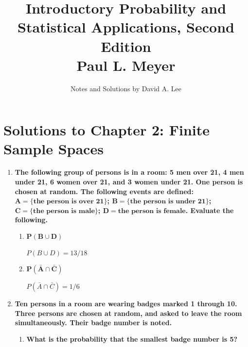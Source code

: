 \documentclass[10pt, oneside]{article}
\title{Introductory Probability and Statistical Applications, Second Edition \\
\large{Paul L. Meyer}}
\author{Notes and Solutions by David A. Lee}
\date{}							%
\begin{document}
\maketitle
\section*{Solutions to Chapter 2: Finite Sample Spaces}

\begin{enumerate}[label=2.\arabic*]
\itemsep0em 
\item  \begin{tcolorbox}[
  colback=Cerulean!5!white,
  colframe=Cerulean!75!black]
\textbf{The following group of persons is in a room: 5 men over 21, 4 men under 21, 6 women over 21, and 3 women under 21. One person is chosen at random. The following events are defined: $\bm{A = \{\text{the person is over 21} \}}$; $\bm{B = \{ \text{the person is under 21} \}}$; $\bm{C = \{ \text{the person is male} \}}$; $\bm{D = \text{the person is female}}$. Evaluate the following.}
\end{tcolorbox}

	\begin{enumerate}
	\item \begin{tcolorbox}[
  colback=Cerulean!5!white,
  colframe=Cerulean!75!black]
  $\bm{P(B \cup D)}$
  \end{tcolorbox}
	
	$P(B \cup D) = \boxed{13/18}$
	
	\item \begin{tcolorbox}[
  colback=Cerulean!5!white,
  colframe=Cerulean!75!black]
	$\bm{P(\bar{A} \cap \bar{C})}$
	\end{tcolorbox}
	
	$P(\bar{A} \cap \bar{C}) = \boxed{1/6}$
	
	\end{enumerate}
	
\item \begin{tcolorbox}[
  colback=Cerulean!5!white,
  colframe=Cerulean!75!black]
\textbf{Ten persons in a room are wearing badges marked 1 through 10. Three persons are chosen at random, and asked to leave the room simultaneously. Their badge number is noted.}
\end{tcolorbox}

	\begin{enumerate}
	\item  \begin{tcolorbox}[
  colback=Cerulean!5!white,
  colframe=Cerulean!75!black]
	\textbf{What is the probability that the smallest badge number is 5?}
	\end{tcolorbox}
	

\end{enumerate}
\end{enumerate}
\end{document}
